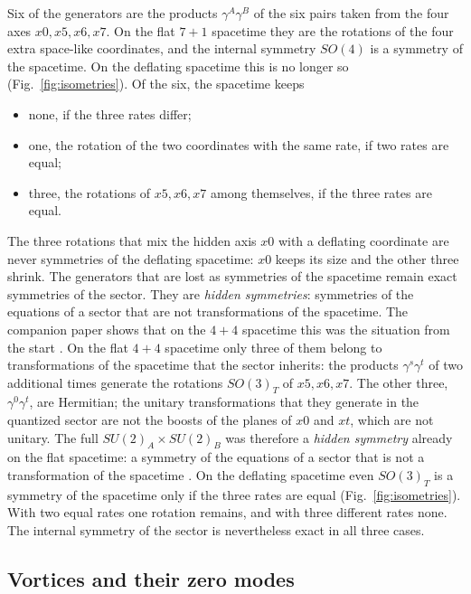 Six of the generators are the products $\gamma^{A}\gamma^{B}$ of the six pairs taken from the four
axes $x0,x5,x6,x7$.
On the flat $7+1$ spacetime they are the rotations of the four extra space-like coordinates, and the
internal symmetry $SO(4)$ is a symmetry of the spacetime. On the deflating spacetime this is no
longer so (Fig.~\ref{fig:isometries}). Of the six, the spacetime keeps
\begin{itemize}
\item none, if the three rates differ;
\item one, the rotation of the two coordinates with the same rate, if two rates are equal;
\item three, the rotations of $x5,x6,x7$ among themselves, if the three rates are equal.
\end{itemize}
The three rotations that mix the hidden axis $x0$ with a deflating coordinate are never symmetries
of the deflating spacetime: $x0$ keeps its size and the other three shrink. The generators that are
lost as symmetries of the spacetime remain exact symmetries of the sector. They are \emph{hidden
symmetries}: symmetries of the equations of a sector that are not transformations of the spacetime.
The companion paper shows that on the $4+4$ spacetime this was the situation from the start
\cite{CompanionDefl1644,Flat1644}.
On the flat $4+4$ spacetime only three of them belong to transformations of the spacetime that the
sector inherits: the products $\gamma^{s}\gamma^{t}$ of two additional times generate the rotations
$SO(3)_T$ of $x5,x6,x7$. The other three, $\gamma^{0}\gamma^{t}$, are Hermitian; the unitary
transformations that they generate in the quantized sector are not the boosts of the planes of $x0$
and $xt$, which are not unitary. The full $SU(2)_A\times SU(2)_B$ was therefore a \emph{hidden
symmetry} already on the flat spacetime: a symmetry of the equations of a sector that is not a
transformation of the spacetime \cite{Flat1644}. On the deflating spacetime even $SO(3)_T$ is a
symmetry of the spacetime only if the three rates are equal (Fig.~\ref{fig:isometries}). With two
equal rates one rotation remains, and with three different rates none. The internal symmetry of the
sector is nevertheless exact in all three cases.

\subsection{Vortices and their zero modes}
\label{sec:vortex}

